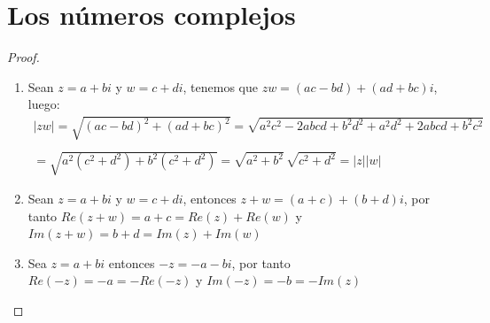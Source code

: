 \documentclass[11pt,letterpaper]{article}
\newcommand{\C}{\mathcal{C}}
\newcommand{\Z}{\mathbb{Z}}
\begin{document}
\section{Los n\'umeros complejos}
\begin{proof}\,\\
    \begin{enumerate}
        \item Sean $z=a+bi$ y $w=c+di$, tenemos que $zw=(ac-bd)+(ad+bc)i$, luego:\,\\
        \begin{align*}
            |zw|=\sqrt{(ac-bd)^2+(ad+bc)^2}=\sqrt{a^2c^2-2abcd+b^2d^2+a^2d^2+2abcd+b^2c^2}\\
            \,\\
            =\sqrt{a^2(c^2+d^2)+b^2(c^2+d^2)}=\sqrt{a^2+b^2}\,\sqrt{c^2+d^2}=|z||w|
        \end{align*}
        \item Sean $z=a+bi$ y $w=c+di$, entonces $z+w=(a+c)+(b+d)i$, por tanto
        $Re(z+w)=a+c=Re(z)+Re(w)$ y $Im(z+w)=b+d=Im(z)+Im(w)$
        \item Sea $z=a+bi$ entonces $-z=-a-bi$, por tanto 
        $Re(-z)=-a=-Re(-z)$ y $Im(-z)=-b=-Im(z)$
    \end{enumerate}
\end{proof}
\end{document}

